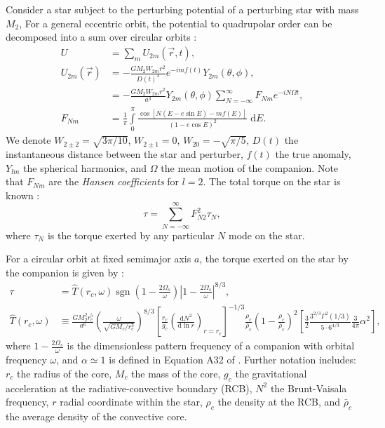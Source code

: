 \documentclass[
        fleqn,
        usenatbib,
        referee,
    ]{mnras}
\newcommand*{\rd}[2]{\frac{\mathrm{d}#1}{\mathrm{d}#2}}
\newcommand*{\abs}[1]{\left|#1\right|}
\newcommand*{\p}[1]{\left(#1\right)}
\newcommand*{\s}[1]{\left[#1\right]}
\DeclareMathOperator*{\sgn}{sgn}
\begin{document}
Consider a star subject to the perturbing potential of a perturbing star with
mass $M_2$, For a general eccentric orbit, the potential to quadrupolar order
can be decomposed into a sum over circular orbits \citep{vlf,sl}:
\begin{align}
    U &= \sum\limits_m U_{2m} \p{\vec{r}, t},\label{eq:u_ecc}\\
    U_{2m}\p{\vec{r}} &= -\frac{GM_2 W_{2m} r^2}{D(t)^3}
            e^{-imf(t)} Y_{2m}(\theta, \phi),\\
        &= -\frac{GM_2W_{2m}r^2}{a^3}Y_{2m}\p{\theta, \phi}
            \sum\limits_{N = -\infty}^\infty F_{Nm}e^{-iN\Omega t},\\
    F_{Nm} &= \frac{1}{\pi}\int\limits_{0}^{\pi}
        \frac{\cos\s{N\p{E - e\sin E} - mf(E)}}
            {\p{1 - e\cos E}^2}\;\mathrm{d}E.
\end{align}
We denote $W_{2 \pm 2} = \sqrt{3\pi/10}$, $W_{2 \pm 1} = 0$, $W_{20} =
-\sqrt{\pi / 5}$, $D(t)$ the instantaneous distance between the star and
perturber, $f(t)$ the true anomaly, $Y_{lm}$ the spherical harmonics, and
$\Omega$ the mean motion of the companion. Note that $F_{Nm}$ are the
\emph{Hansen coefficients} for $l = 2$. The total torque on the star is known
\citep{vlf}:
\begin{equation}
    \tau = \sum\limits_{N = -\infty}^\infty F_{N2}^2 \tau_N,\label{eq:tau_each}
\end{equation}
where $\tau_N$ is the torque exerted by any particular $N$ mode on the star.

For a circular orbit at fixed semimajor axis $a$, the torque exerted on the star
by the companion is given by \citealt{kushnir}:
\begin{align}
    \tau &= \hat{T}(r_c, \omega) \sgn\p{1 - \frac{2\Omega_s}{\omega}}
        \abs{1 - \frac{2\Omega_s}{\omega}}^{8/3}
            \label{eq:kushnir_torque},\\
    \hat{T}(r_c, \omega) &\equiv \frac{GM_2^2r_c^5}{a^6}
        \p{\frac{\omega}{\sqrt{GM_c/r_c^3}}}^{8/3}
        \s{\frac{r_c}{g_c}\p{\rd{N^2}{\ln r}}_{r = r_c}}^{-1/3}
            \frac{\rho_c}{\bar{\rho}_c} \p{1 - \frac{\rho_c}{\bar{\rho}_c}}^2
            \s{\frac{3}{2}\frac{3^{2/3}\Gamma^2(1/3)}{5 \cdot
                6^{4/3}} \frac{3}{4\pi}\alpha^2},
\end{align}
where $1 - \frac{2\Omega_s}{\omega}$ is the dimensionless pattern frequency of a
companion with orbital frequency $\omega$, and $\alpha \simeq 1$ is defined in
Equation A32 of \citealt{kushnir}. Further notation includes: $r_c$ the radius
of the core, $M_c$ the mass of the core, $g_c$ the gravitational acceleration at
the radiative-convective boundary (RCB), $N^2$ the Brunt-Vaisala frequency, $r$
radial coordinate within the star, $\rho_c$ the density at the RCB, and
$\bar{\rho}_c$ the average density of the convective core.
\end{document}
